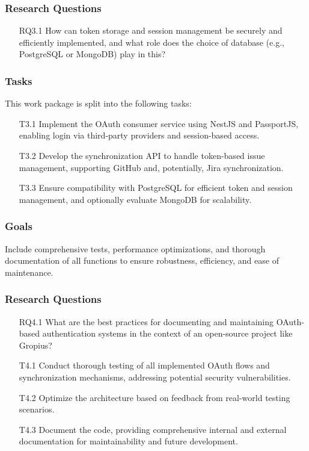 \subsubsection{Research Questions}
\begin{itemize}
	\item[RQ3.1]
	How can token storage and session management be securely and efficiently implemented, and
	what role does the choice of database (e.g., PostgreSQL or MongoDB) play in this?
\end{itemize}

\subsubsection{Tasks}
This work package is split into the following tasks:
\begin{itemize}
	\item[T3.1] Implement the OAuth consumer service using NestJS and PassportJS, enabling login via third-party providers and session-based access.
	\item[T3.2] Develop the synchronization API to handle token-based issue management, supporting GitHub and, potentially, Jira synchronization.
	\item[T3.3] Ensure compatibility with PostgreSQL for efficient token and session management, and optionally evaluate MongoDB for scalability.
\end{itemize}

\subsubsection{Goals}
Include comprehensive tests, performance optimizations, and thorough documentation of all functions to ensure robustness, efficiency, and ease of maintenance.
\subsubsection{Research Questions}
\begin{itemize}
	\item[RQ4.1] What are the best practices for documenting and maintaining OAuth-based authentication systems in the context of an open-source project like Gropius?
\end{itemize}
\begin{itemize}
	\item[T4.1] Conduct thorough testing of all implemented OAuth flows and synchronization mechanisms, addressing potential security vulnerabilities.
	\item[T4.2] Optimize the architecture based on feedback from real-world testing scenarios.
	\item[T4.3] Document the code, providing comprehensive internal and external documentation for maintainability and future development.
\end{itemize}


